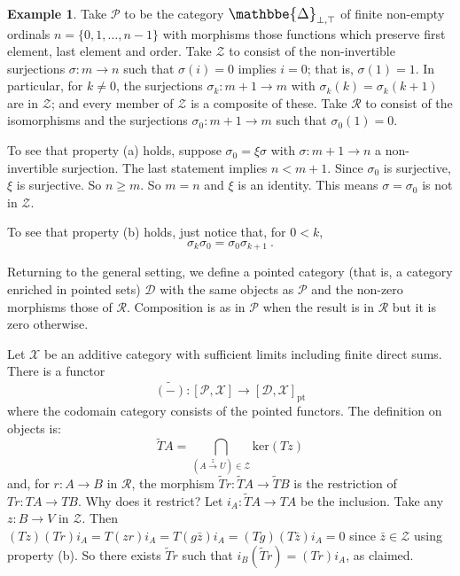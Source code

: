 \documentclass[a4paper,12pt,reqno]{amsart}
\def\makebigger#1#2#3{\hbox{#1$\mathsurround=0pt #2{#3}$}}
\def\bigger#1#2{{\relax\mathpalette{\makebigger#1}{#2}}}
\newcommand{\DelCat}{{\bigger\large{\mathbbe{\Delta}}}}
\theoremstyle{definition}
\newtheorem{example}[theorem]{Example}
\theoremstyle{fact}
\theoremstyle{genquest}
\theoremstyle{step}
\newcommand{\lra}{\longrightarrow}
\def\CD{{\mathscr D}}
\def\CP{{\mathscr P}}
\def\CR{{\mathscr R}}
\def\CX{{\mathscr X}}
\def\CZ{{\mathscr Z}}
\begin{document}
\begin{example}\label{Ex2}
Take $\CP$ to be the category $\DelCat_{\bot,\top}$ of finite
non-empty ordinals $n = \{0,1,\dots,n-1\}$
with morphisms those functions which preserve
first element, last element and order.
Take $\CZ$ to consist of the non-invertible surjections $\sigma : m \lra n$
such that $\sigma (i) = 0$ implies $i = 0$; that is, $\sigma (1) = 1$.
In particular, for $k \neq 0$, the surjections $\sigma_k : m+1 \lra m$ with 
$\sigma_k(k)=\sigma_k(k+1)$ are in $\CZ$;
and every member of $\CZ$ is a composite of these.
Take $\CR$ to consist of the isomorphisms and the surjections 
$\sigma_0 : m+1 \lra m$ such that $\sigma_0 (1) = 0$.

To see that property (a) holds, suppose $\sigma_0 = \xi \sigma$ with
$\sigma : m+1 \lra n$ a non-invertible surjection. The
last statement implies $n< m+1$. Since $\sigma_0$ is surjective,
$\xi$ is surjective. So $n\geq m$. So $m=n$ and $\xi$ is an
identity. This means $\sigma = \sigma_0$ is not in $\CZ$.

To see that property (b) holds, just notice that, for $0<k$, 
$$\sigma_k \sigma_0 = \sigma_0 \sigma_{k+1} \ .$$ 
\end{example}

\bigskip
Returning to the general setting, we define a pointed category 
(that is, a category enriched in pointed sets) $\CD$ with the same objects
as $\CP$ and the non-zero morphisms those of $\CR$.
Composition is as in $\CP$ when the result is in $\CR$ but it is zero
otherwise.

Let $\CX$ be an additive category with sufficient limits including
finite direct sums. There is a functor
\begin{equation}\label{tilde}
\widetilde{(-)} : [\CP,\CX] \lra [\CD,\CX]_{\mathrm{pt}}
\end{equation}
where the codomain category consists of the pointed functors.
The definition on objects is:
\begin{equation}\label{tildeformula}
\widetilde{T}A = \bigcap_{(A\stackrel{z}\lra U) \in \CZ} {\mathrm{ker}}(Tz)
\end{equation}
and, for $r:A\lra B$ in $\CR$, the morphism 
$\widetilde{T}r : \widetilde{T}A \lra \widetilde{T}B$
is the restriction of $Tr : TA \lra TB$. 
Why does it restrict? Let $i_A : \widetilde{T}A \lra TA$
be the inclusion. Take any $z : B \lra V$ in $\CZ$.   
Then $(Tz)(Tr)i_A = T(zr)i_A = T(g\bar{z})i_A = (Tg)(T\bar{z})i_A = 0$
since $\bar{z} \in \CZ$ using property (b). 
So there exists $\widetilde{T}r$ such that $i_B (\widetilde{T}r) = (Tr)i_A$,
as claimed.
\end{document}
